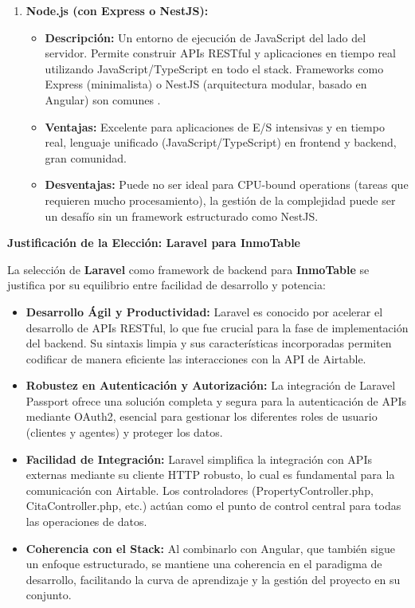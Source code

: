 \begin{enumerate}
    \item \textbf{Node.js (con Express o NestJS):}
    \begin{itemize}
        \item \textbf{Descripción:} Un entorno de ejecución de JavaScript del lado del servidor. Permite construir APIs RESTful y aplicaciones en tiempo real utilizando JavaScript/TypeScript en todo el stack. Frameworks como Express (minimalista) o NestJS (arquitectura modular, basado en Angular) son comunes \cite{back4app2024backend}.
        \item \textbf{Ventajas:} Excelente para aplicaciones de E/S intensivas y en tiempo real, lenguaje unificado (JavaScript/TypeScript) en frontend y backend, gran comunidad.
        \item \textbf{Desventajas:} Puede no ser ideal para CPU-bound operations (tareas que requieren mucho procesamiento), la gestión de la complejidad puede ser un desafío sin un framework estructurado como NestJS.
    \end{itemize}

\end{enumerate}

\textbf{Justificación de la Elección: Laravel para InmoTable}

La selección de \textbf{Laravel} como framework de backend para \textbf{InmoTable} se justifica por su equilibrio entre facilidad de desarrollo y potencia:

\begin{itemize}
    \item \textbf{Desarrollo Ágil y Productividad:} Laravel es conocido por acelerar el desarrollo de APIs RESTful, lo que fue crucial para la fase de implementación del backend. Su sintaxis limpia y sus características incorporadas permiten codificar de manera eficiente las interacciones con la API de Airtable.
    \item \textbf{Robustez en Autenticación y Autorización:} La integración de Laravel Passport ofrece una solución completa y segura para la autenticación de APIs mediante OAuth2, esencial para gestionar los diferentes roles de usuario (clientes y agentes) y proteger los datos.
    \item \textbf{Facilidad de Integración:} Laravel simplifica la integración con APIs externas mediante su cliente HTTP robusto, lo cual es fundamental para la comunicación con Airtable. Los controladores (PropertyController.php, CitaController.php, etc.) actúan como el punto de control central para todas las operaciones de datos.
    \item \textbf{Coherencia con el Stack:} Al combinarlo con Angular, que también sigue un enfoque estructurado, se mantiene una coherencia en el paradigma de desarrollo, facilitando la curva de aprendizaje y la gestión del proyecto en su conjunto.
\end{itemize}


